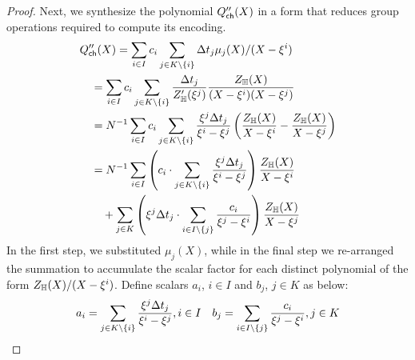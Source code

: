 \begin{proof}
    Next, we synthesize the polynomial $Q''_{\mathsf{ch}}({X})$ in a form that reduces group operations required to compute its encoding.
    \begin{align}\label{eq:Qcachepoly2}
    &Q''_{\mathsf{ch}}({X}) = \sum_{i\in I}c_i\sum_{j\in K\setminus \{i\}} \Delta t_j\mu_j(X)/(X-\xi^i) \nonumber \\
    &\quad = \sum_{i\in I}c_i\sum_{j\in K\setminus \{i\}}\frac{\Delta t_j}{Z_{\mathbb{H}}'(\xi^j)} \frac{Z_{\mathbb{H}}(X)}{(X-\xi^i)(X-\xi^j)} \nonumber \\
    &\quad = N^{-1}\sum_{i\in I}c_i\sum_{j\in K\setminus \{i\}}\frac{\xi^j\Delta t_j}{\xi^i-\xi^j}
    \left(\frac{Z_{\mathbb{H}}(X)}{X-\xi^i} - \frac{Z_{\mathbb{H}}(X)}{X-\xi^j}\right) \nonumber \\
    &\quad = N^{-1}\sum_{i\in I}\left(c_i\cdot \sum_{j\in K\setminus \{i\}} \frac{\xi^j\Delta t_j}{\xi^i-\xi^j}\right)\frac{Z_{\mathbb{H}}(X)}{X-\xi^i} \nonumber \\
    &\qquad + \sum_{j\in K}\left(\xi^j\Delta t_j\cdot \sum_{i\in I\setminus \{j\}}\frac{c_i}{\xi^j-\xi^i}\right)\frac{Z_{\mathbb{H}}(X)}{X-\xi^j}
    \end{align}
    In the first step, we substituted $\mu_j(X)$, while in the final step we re-arranged the summation to accumulate the scalar factor for
    each distinct polynomial of the form $Z_\mathbb{H}(X)/(X-\xi^i)$. Define scalars $a_i$, $i\in I$ and $b_j$, $j\in K$ as below:
    \begin{gather}\label{eq:scalars}
    a_i = \sum_{j\in K\setminus \{i\}}\frac{\xi^j\Delta t_j}{\xi^i-\xi^j}, i\in \setind\quad
    b_j=  \sum_{i\in \setind\setminus \{j\}}\frac{c_i}{\xi^j - \xi^i}, j\in K

\end{gather}
\end{proof}
